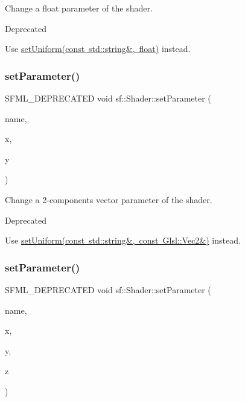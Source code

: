 Change a float parameter of the shader. 

\begin{DoxyRefDesc}{Deprecated}
\item[\mbox{\hyperlink{deprecated__deprecated000006}{Deprecated}}]Use \mbox{\hyperlink{classsf_1_1_shader_abf78e3bea1e9b0bab850b6b0a0de29c7}{set\+Uniform(const std\+::string\&, float)}} instead. \end{DoxyRefDesc}
\begin{DoxyVerb}\end{DoxyVerb}
 \mbox{\label{classsf_1_1_shader_a61f5cdb5847fc3b57335b095a2f3dad3}} 
\subsubsection{\texorpdfstring{setParameter()}{setParameter()}\hspace{0.1cm}{\footnotesize\ttfamily [2/10]}}
{\footnotesize\ttfamily S\+F\+M\+L\+\_\+\+D\+E\+P\+R\+E\+C\+A\+T\+ED void sf\+::\+Shader\+::set\+Parameter (\begin{DoxyParamCaption}\item[{const std\+::string \&}]{name,  }\item[{float}]{x,  }\item[{float}]{y }\end{DoxyParamCaption})}



Change a 2-\/components vector parameter of the shader. 

\begin{DoxyRefDesc}{Deprecated}
\item[\mbox{\hyperlink{deprecated__deprecated000007}{Deprecated}}]Use \mbox{\hyperlink{classsf_1_1_shader_a4a2c673c41e37b17d67e4af1298b679f}{set\+Uniform(const std\+::string\&, const Glsl\+::\+Vec2\&)}} instead. \end{DoxyRefDesc}
\begin{DoxyVerb}\end{DoxyVerb}
 \mbox{\label{classsf_1_1_shader_a1fa0fb11cabd8553ccd37e97c725c992}} 
\subsubsection{\texorpdfstring{setParameter()}{setParameter()}\hspace{0.1cm}{\footnotesize\ttfamily [3/10]}}
{\footnotesize\ttfamily S\+F\+M\+L\+\_\+\+D\+E\+P\+R\+E\+C\+A\+T\+ED void sf\+::\+Shader\+::set\+Parameter (\begin{DoxyParamCaption}\item[{const std\+::string \&}]{name,  }\item[{float}]{x,  }\item[{float}]{y,  }\item[{float}]{z }\end{DoxyParamCaption})}



